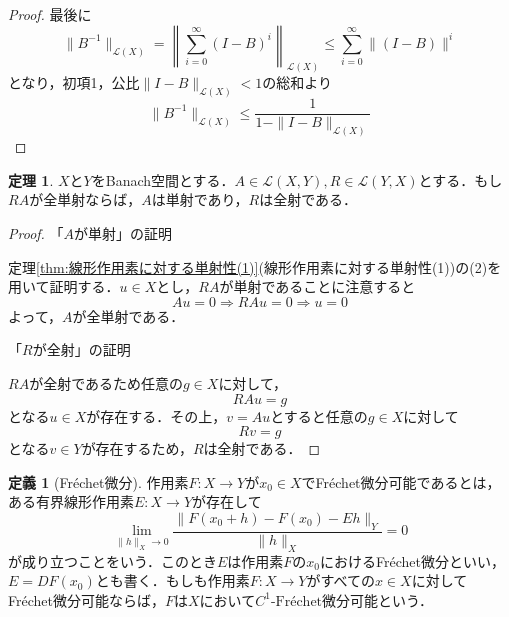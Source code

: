 \documentclass[11pt,a4paper,titlepage]{jsreport}
\theoremstyle{definition}
\newtheorem{dfn}{定義}
\newtheorem{thm}{定理}
\begin{document}
\begin{proof}
  最後に
  \begin{equation*}
    \|B^{-1}\|_{\mathcal{L}(X)} = \left \| \sum^\infty_{i=0}(I-B)^i \right \| _{\mathcal{L}(X)} \leq \sum^\infty_{i=0}\|(I-B)\|^i
  \end{equation*}
  となり，初項1，公比$\|I-B\|_{\mathcal{L}(X)}<1$の総和より
  \begin{equation*}
    \|B^{-1}\|_{\mathcal{L}(X)} \leq \frac{1}{1-\|I-B\|_{\mathcal{L}(X)}}
  \end{equation*}
\end{proof}

\begin{thm}
  \label{thm:Banachの全単射}
  $X$と$Y$をBanach空間とする．$A\in\mathcal{L}(X,Y),R\in\mathcal{L}(Y,X)$とする．もし$RA$が全単射ならば，$A$は単射であり，$R$は全射である．
\end{thm}

\begin{proof}
  「$A$が単射」の証明

  定理\ref{thm:線形作用素に対する単射性(1)}(線形作用素に対する単射性(1))の(2)を用いて証明する．$u\in X$とし，$RA$が単射であることに注意すると
  \begin{equation*}
    Au=0 \Rightarrow RAu=0 \Rightarrow u=0
  \end{equation*}
  よって，$A$が全単射である．

  「$R$が全射」の証明

  $RA$が全射であるため任意の$g\in X$に対して，
  \begin{equation*}
    RAu=g
  \end{equation*}
  となる$u\in X$が存在する．その上，$v=Au$とすると任意の$g\in X$に対して
  \begin{equation*}
    Rv=g
  \end{equation*}
  となる$v\in Y$が存在するため，$R$は全射である．
\end{proof}

\begin{dfn}[Fr\'{e}chet微分]
  作用素$F:X\rightarrow Y$が$x_0\in X$でFr\'{e}chet微分可能であるとは，ある有界線形作用素$E:X\rightarrow Y$が存在して
  \begin{equation*}
    \lim_{\|h\|_X\rightarrow 0} \frac{\|F(x_0+h)-F(x_0)-Eh\|_Y}{\|h\|_X} = 0
  \end{equation*}
  が成り立つことをいう．このとき$E$は作用素$F$の$x_0$におけるFr\'{e}chet微分といい，$E=DF(x_0)$とも書く．もしも作用素$F:X\rightarrow Y$がすべての$x\in X$に対してFr\'{e}chet微分可能ならば，$F$は$X$において$C^1\textrm{-Fr\'{e}chet}$微分可能という．
\end{dfn}
\end{document}
